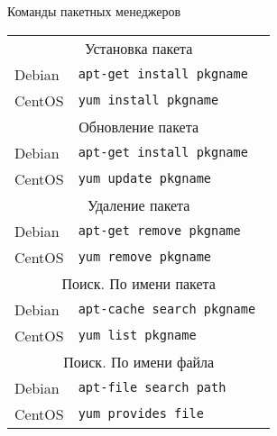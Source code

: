 \begin{frame}{Команды пакетных менеджеров}
        \begin{tabular}{ll}
            \multicolumn{2}{c}{Установка пакета }   \tabularnewline
            Debian & {\tt apt-get install pkgname } \\
            CentOS & {\tt yum install pkgname } \\
            \multicolumn{2}{c}{Обновление пакета }  \tabularnewline
            Debian & {\tt apt-get install pkgname } \\
            CentOS & {\tt yum update pkgname }  \\
            \multicolumn{2}{c}{Удаление пакета }   \tabularnewline
            Debian & {\tt apt-get remove pkgname } \\ 
            CentOS & {\tt yum remove pkgname }  \\
            \multicolumn{2}{c}{Поиск. По имени пакета}   \tabularnewline
            Debian & {\tt apt-cache search pkgname } \\
            CentOS & {\tt yum list pkgname }  \\
            \multicolumn{2}{c}{Поиск. По имени файла}   \tabularnewline
            Debian & {\tt apt-file search path } \\
            CentOS & {\tt yum provides file} 
        \end{tabular}
\end{frame}
